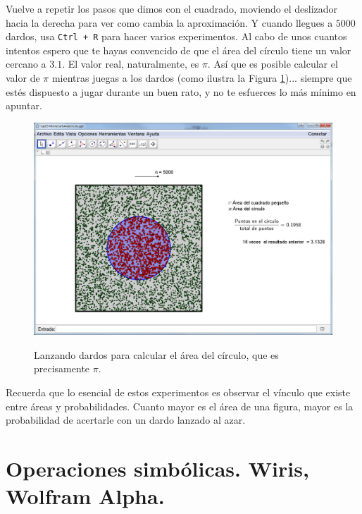 \documentclass[10pt,a4paper]{article}\usepackage[]{graphicx}\usepackage[]{color}
\begin{document}
Vuelve a repetir los pasos que dimos con el cuadrado, moviendo el deslizador hacia la derecha para ver como cambia la aproximación. Y cuando llegues a $5000$ dardos, usa {\tt Ctrl + R} para hacer varios experimentos. Al cabo de unos cuantos intentos espero que te hayas convencido de que el área del círculo tiene un valor cercano a $3.1$. El valor real, naturalmente, es $\pi$. Así que es posible calcular el valor de $\pi$ mientras juegas a los dardos (como ilustra la Figura \ref{tut03:fig:MontecarloAreaCirculo03})... siempre que estés dispuesto a jugar durante un buen rato, y no te esfuerces lo más mínimo en apuntar.
\begin{figure}[h!]
\begin{center}
\includegraphics[width=15cm]{./fig/Tut03-45a.png}\\[3mm]
\end{center}
\caption{Lanzando dardos para calcular el área del círculo, que es precisamente $\pi$.}
\label{tut03:fig:MontecarloAreaCirculo03}
\end{figure}
Recuerda que lo esencial de estos experimentos es observar el vínculo que existe entre áreas y probabilidades. Cuanto mayor es el área de una figura, mayor es la probabilidad de acertarle con un dardo lanzado al azar.


\section{Operaciones simbólicas. Wiris, Wolfram Alpha.}
\label{tut03:sec:OperacionesSimbolicas}
\end{document}
